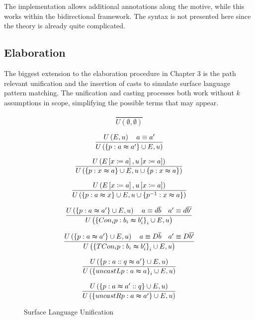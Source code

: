 The implementation allows additional annotations along the motive,
while this works within the bidirectional framework. The syntax is
not presented here since the theory is already quite complicated.

\subsection{Elaboration}


The biggest extension to the elaboration procedure in Chapter 3 is
the path relevant unification and the insertion of casts to simulate
surface language pattern matching. The unification and casting processes
both work without $k$ assumptions in scope, simplifying the possible
terms that may appear.

\begin{figure}
\[
\frac{\,}{U\left(\emptyset,\emptyset\right)}
\]

\[
\frac{U\left(E,u\right)\quad a\equiv a'}{U\left(\left\{ p:a\thickapprox a'\right\} \cup E,u\right)}
\]

\[
\frac{U\left(E\left[x\coloneqq a\right],u\left[x\coloneqq a\right]\right)}{U\left(\left\{ p:x\thickapprox a\right\} \cup E,u\cup\left\{ p:x\thickapprox a\right\} \right)}
\]


\[
\frac{U\left(E\left[x\coloneqq a\right],u\left[x\coloneqq a\right]\right)}{U\left(\left\{ p:a\thickapprox x\right\} \cup E,u\cup\left\{ p^{-1}:x\thickapprox a\right\} \right)}
\]

\[
\frac{U\left(\left\{ p:a\thickapprox a'\right\} \cup E,u\right)\quad a\equiv d\overline{b}\quad a'\equiv d\overline{b'}}{U\left(\left\{ Con_{i}p:b_{i}\thickapprox b'_{i}\right\} _{i}\cup E,u\right)}
\]


\[
\frac{U\left(\left\{ p:a\thickapprox a'\right\} \cup E,u\right)\quad a\equiv D\overline{b}\quad a'\equiv D\overline{b'}}{U\left(\left\{ TCon_{i}p:b_{i}\thickapprox b'_{i}\right\} _{i}\cup E,u\right)}
\]


\[
\frac{U\left(\left\{ p:a::q\thickapprox a'\right\} \cup E,u\right)}{U\left(\left\{ uncastLp:a\thickapprox a\right\} _{i}\cup E,u\right)}
\]

\[
\frac{U\left(\left\{ p:a\thickapprox a'::q\right\} \cup E,u\right)}{U\left(\left\{ uncastRp:a\thickapprox a'\right\} \cup E,u\right)}
\]





\caption{Surface Language Unification}
\label{fig:surface-data-unification}
\end{figure}

